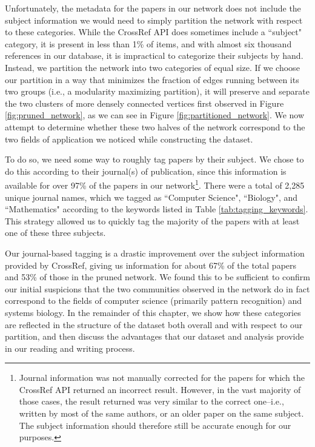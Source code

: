 \documentclass[12pt]{thesis}
\theoremstyle{plain}
\theoremstyle{definition}
\theoremstyle{remark}
\begin{document}
Unfortunately, the metadata for the papers in our network does not include the subject information we would need to simply partition the network with respect to these categories. While the CrossRef API does sometimes include a ``subject" category, it is present in less than 1\% of items, and with almost six thousand references in our database, it is impractical to categorize their subjects by hand. Instead, we partition the network into two categories of equal size. If we choose our partition in a way that minimizes the fraction of edges running between its two groups (i.e., a modularity maximizing partition), it will preserve and separate the two clusters of more densely connected vertices first observed in Figure \ref{fig:pruned_network}, as we can see in Figure \ref{fig:partitioned_network}. We now attempt to determine whether these two halves of the network correspond to the two fields of application we noticed while constructing the dataset.

To do so, we need some way to roughly tag papers by their subject. We chose to do this according to their journal(s) of publication, since this information is available for over 97\% of the papers in our network\footnote{Journal information was not manually corrected for the papers for which the CrossRef API returned an incorrect result. However, in the vast majority of those cases, the result returned was very similar to the correct one--i.e., written by most of the same authors, or an older paper on the same subject. The subject information should therefore still be accurate enough for our purposes.}. There were a total of 2,285 unique journal names, which we tagged as ``Computer Science", ``Biology", and ``Mathematics" according to the keywords listed in Table \ref{tab:tagging_keywords}. This strategy allowed us to quickly tag the majority of the papers with at least one of these three subjects.

Our journal-based tagging is a drastic improvement over the subject information provided by CrossRef, giving us information for about 67\% of the total papers and 53\% of those in the pruned network. We found this to be sufficient to confirm our initial suspicions that the two communities observed in the network do in fact correspond to the fields of computer science (primarily pattern recognition) and systems biology. In the remainder of this chapter, we show how these categories are reflected in the structure of the dataset both overall and with respect to our partition, and then discuss the advantages that our dataset and analysis provide in our reading and writing process.
\end{document}
